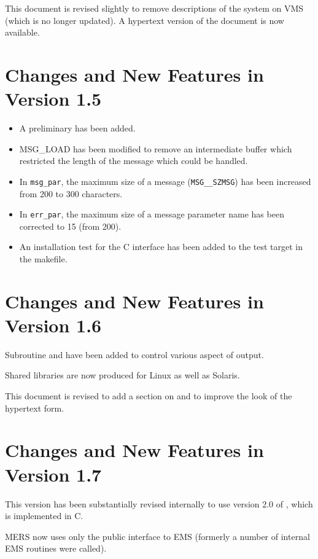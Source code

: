 \documentclass[twoside,11pt]{starlink}
\begin{document}
This document is revised slightly to remove descriptions of the system on VMS
(which is no longer updated). A hypertext version of the document is now
available.

\section{Changes and New Features in Version 1.5}
\begin{itemize}
\item A preliminary
 has been added.
\item MSG\_LOAD has been modified to remove an intermediate buffer which
restricted the length of the message which could be handled.
\item In \texttt{msg\_par}, the maximum size of a message
(\texttt{MSG\_\_SZMSG}) has been increased from 200 to 300 characters.
\item In \texttt{err\_par}, the maximum size of a message parameter name has
been corrected to 15 (from 200).
\item An installation test for the C interface has been added to the test
target in the makefile.
\end{itemize}

\section{Changes and New Features in Version 1.6}
Subroutine
and
have been added to control various aspect of output.

Shared libraries are now produced for Linux as well as Solaris.

This document is revised to add a section on
 and to improve the look of the hypertext form.

\section{Changes and New Features in Version 1.7}
This version has been substantially revised internally to use version 2.0 of
,
which is implemented in C.

MERS now uses only the public interface to EMS (formerly a number of internal
EMS routines were called).
\end{document}
